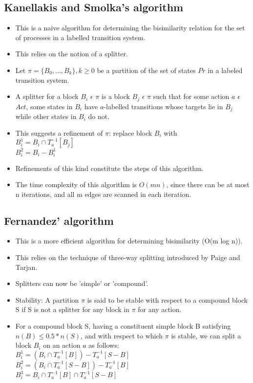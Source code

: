 \documentclass{article}
\begin{document}
\subsection{Kanellakis and Smolka's algorithm}

  \begin{itemize}
  \item This is a naive algorithm for determining the bisimilarity
    relation for the set of processes in a labelled transition system.
  \item This relies on the notion of a splitter.
  \item Let $\pi = \{ B_0, ..., B_k \}, k \ge 0$ be a partition of the
    set of states $Pr$ in a labeled transition system.
  \item A splitter for a block $B_i$ $\epsilon$ $\pi$ is a block $B_j$
    $\epsilon$ $\pi$ such that for some action $a$ $\epsilon$ $Act$, some
    states in $B_i$ have $a$-labelled transitions whose targets lie in
    $B_j$ while other states in $B_i$ do not.
  \item This suggests a refinement of $\pi$: replace block $B_i$ with
    \\
    $B_i^1 = B_i \cap T_a^{-1}[B_j] $ \\
    $B_i^2 = B_i - B_i^1 $
  \item Refinements of this kind constitute the steps of this
    algorithm.
  \item The time complexity of this algorithm is $O(mn)$, since there
    can be at most n iterations, and all m edges are scanned in each iteration.
  \end{itemize}

\subsection{Fernandez' algorithm}

  \begin{itemize}
  \item This is a more efficient algorithm for determining bisimilarity (O(m log n)).
  \item This relies on the technique of three-way splitting introduced
    by Paige and Tarjan.
  \item Splitters can now be 'simple' or 'compound'.
  \item Stability: A partition $\pi$ is said to be stable with respect to a
    compound block S if S is not a splitter for any block in $\pi$ for
    any action.
  \item For a compound block S, having a constituent simple block B
    satisfying $n(B) \le 0.5*n(S)$, and with respect to which $\pi$ is
    stable, we can split a block $B_i$ on an action $a$ as follows:\\
    $B_i^1 = (B_i \cap T_a^{-1}[B]) - T_a^{-1}[S-B]$ \\
    $B_i^2 = (B_i \cap T_a^{-1}[S-B]) - T_a^{-1}[B]$ \\
    $B_i^3 = B_i \cap T_a^{-1}[B] \cap T_a^{-1}[S-B]$ \\
  \end{itemize}
\end{document}

